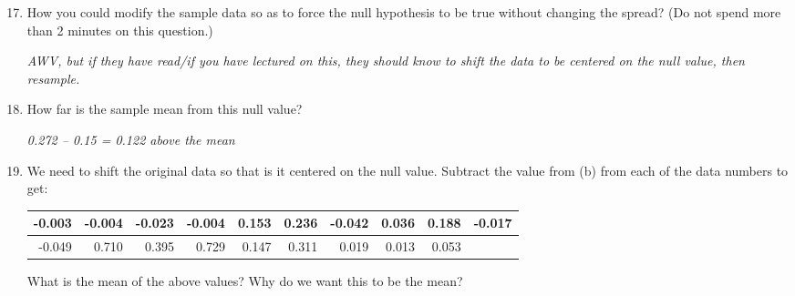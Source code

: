 \begin{enumerate}
\setcounter{enumi}{16}
\item How you could modify the sample data so as to force the null
  hypothesis to be true without changing the spread?  (Do not spend
  more than 2 minutes on this question.)
\begin{students}
  \vspace{2cm}
\end{students}

\begin{key}
  {\it  AWV, but if they have read/if you have lectured on this, they
    should know to shift the data to be centered on the null value,
    then resample.} 
\end{key}


\item  \label{shift}How far is the sample mean from this null value?
\begin{students}
  \vspace{2cm}
\end{students}

\begin{key}
  {\it 0.272 – 0.15 = 0.122 above the mean}
\end{key}

\item We need to shift the original data so that is it centered on the null
      value. 
      Subtract the value from (b) from each of the data numbers to
      get:


\begin{center}
\begin{tabular}{|r|r|r|r|r|r|r|r|r|r|} \hline
-0.003 &-0.004 &-0.023 &-0.004 &0.153 &0.236 &-0.042 &0.036 &0.188 &-0.017
\\ \hline
-0.049 &0.710 &0.395 &0.729 &0.147 &0.311 &0.019 &0.013 &0.053
& \\ \hline
\end{tabular}  
\end{center}
      What is the mean of the above values? Why do we want this
      to be the mean?
\begin{students}
  \vspace{1cm}
\end{students}


\end{enumerate}
